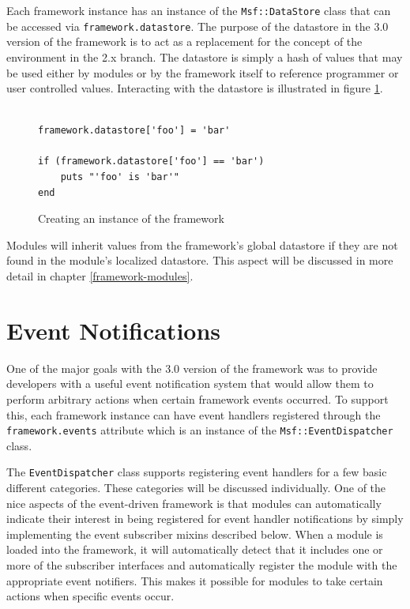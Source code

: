\documentclass{report}
\begin{document}
\par
Each framework instance has an instance of the
\texttt{Msf::DataStore} class that can be accessed via
\texttt{framework.datastore}.  The purpose of the datastore in the
3.0 version of the framework is to act as a replacement for the
concept of the environment in the 2.x branch.  The datastore is
simply a hash of values that may be used either by modules or by the
framework itself to reference programmer or user controlled values.
Interacting with the datastore is illustrated in figure
\ref{fig-code-framework-datastore}.

\begin{figure}[h]
\begin{verbatim}

framework.datastore['foo'] = 'bar'

if (framework.datastore['foo'] == 'bar')
    puts "'foo' is 'bar'"
end
\end{verbatim}
\caption{Creating an instance of the framework}
\label{fig-code-framework-datastore}
\end{figure}

\par
Modules will inherit values from the framework's global datastore if
they are not found in the module's localized datastore.  This aspect
will be discussed in more detail in chapter \ref{framework-modules}.

    \section{Event Notifications}

\par
One of the major goals with the 3.0 version of the framework was to
provide developers with a useful event notification system that
would allow them to perform arbitrary actions when certain framework
events occurred.  To support this, each framework instance can have
event handlers registered through the \texttt{framework.events}
attribute which is an instance of the \texttt{Msf::EventDispatcher}
class.

\par
The \texttt{EventDispatcher} class supports registering event
handlers for a few basic different categories.  These categories
will be discussed individually.  One of the nice aspects of the
event-driven framework is that modules can automatically indicate
their interest in being registered for event handler notifications
by simply implementing the event subscriber mixins described below.
When a module is loaded into the framework, it will automatically
detect that it includes one or more of the subscriber interfaces and
automatically register the module with the appropriate event
notifiers.  This makes it possible for modules to take certain
actions when specific events occur.
\end{document}
